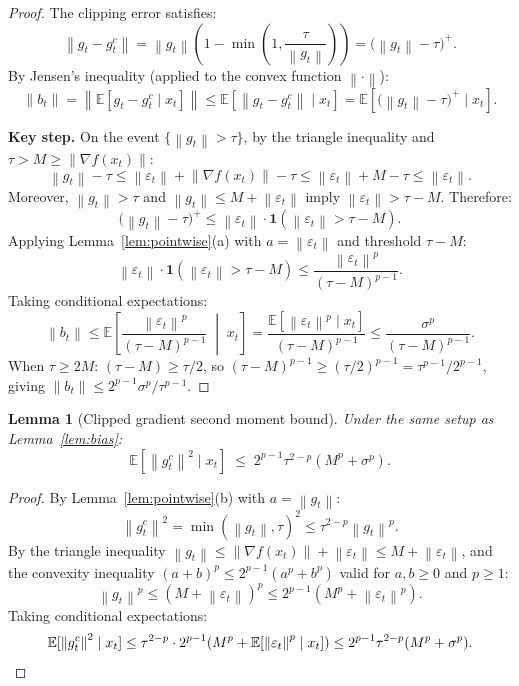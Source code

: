 \documentclass[11pt]{article}
\newtheorem{lemma}[theorem]{Lemma}
\theoremstyle{definition}
\newcommand{\E}{\mathbb{E}}
\newcommand{\norm}[1]{\left\| #1 \right\|}
\begin{document}
\begin{proof}
The clipping error satisfies:
\[
  \norm{g_t - g_t^c}
  = \norm{g_t}\!\left(1 - \min\!\left(1, \frac{\tau}{\norm{g_t}}\right)\right)
  = \bigl(\norm{g_t} - \tau\bigr)^+.
\]
By Jensen's inequality (applied to the convex function $\norm{\cdot}$):
\[
  \norm{b_t} = \norm{\E[g_t - g_t^c \mid x_t]}
  \leq \E\!\left[\norm{g_t - g_t^c} \mid x_t\right]
  = \E\!\left[\bigl(\norm{g_t} - \tau\bigr)^+ \mid x_t\right].
\]

\textbf{Key step.} On the event $\{\norm{g_t} > \tau\}$, by the triangle
inequality and $\tau > M \geq \norm{\nabla f(x_t)}$:
\[
  \norm{g_t} - \tau
  \leq \norm{\varepsilon_t} + \norm{\nabla f(x_t)} - \tau
  \leq \norm{\varepsilon_t} + M - \tau
  \leq \norm{\varepsilon_t}.
\]
Moreover, $\norm{g_t} > \tau$ and $\norm{g_t} \leq M + \norm{\varepsilon_t}$
imply $\norm{\varepsilon_t} > \tau - M$. Therefore:
\[
  \bigl(\norm{g_t} - \tau\bigr)^+
  \leq \norm{\varepsilon_t} \cdot \mathbf{1}\!\left(\norm{\varepsilon_t} > \tau - M\right).
\]
Applying Lemma~\ref{lem:pointwise}(a) with $a = \norm{\varepsilon_t}$ and
threshold $\tau - M$:
\[
  \norm{\varepsilon_t} \cdot \mathbf{1}(\norm{\varepsilon_t} > \tau - M)
  \leq \frac{\norm{\varepsilon_t}^p}{(\tau - M)^{p-1}}.
\]
Taking conditional expectations:
\[
  \norm{b_t}
  \leq \E\!\left[\frac{\norm{\varepsilon_t}^p}{(\tau - M)^{p-1}} \;\middle|\; x_t\right]
  = \frac{\E[\norm{\varepsilon_t}^p \mid x_t]}{(\tau - M)^{p-1}}
  \leq \frac{\sigma^p}{(\tau - M)^{p-1}}.
\]
When $\tau \geq 2M$: $(\tau - M) \geq \tau/2$, so $(\tau - M)^{p-1} \geq (\tau/2)^{p-1}
= \tau^{p-1}/2^{p-1}$, giving $\norm{b_t} \leq 2^{p-1}\sigma^p/\tau^{p-1}$.
\end{proof}

\begin{lemma}[Clipped gradient second moment bound]\label{lem:variance}
Under the same setup as Lemma~\ref{lem:bias}:
\[
  \E\!\left[\norm{g_t^c}^2 \mid x_t\right]
  \;\leq\; 2^{p-1}\tau^{2-p}\!\left(M^p + \sigma^p\right).
\]
\end{lemma}

\begin{proof}
By Lemma~\ref{lem:pointwise}(b) with $a = \norm{g_t}$:
\[
  \norm{g_t^c}^2 = \min(\norm{g_t}, \tau)^2 \leq \tau^{2-p}\norm{g_t}^p.
\]
By the triangle inequality $\norm{g_t} \leq \norm{\nabla f(x_t)} + \norm{\varepsilon_t}
\leq M + \norm{\varepsilon_t}$, and the convexity inequality $(a + b)^p \leq
2^{p-1}(a^p + b^p)$ valid for $a, b \geq 0$ and $p \geq 1$:
\[
  \norm{g_t}^p \leq (M + \norm{\varepsilon_t})^p \leq 2^{p-1}(M^p + \norm{\varepsilon_t}^p).
\]
Taking conditional expectations:
\[
  \E[\norm{g_t^c}^2 \mid x_t]
  \leq \tau^{2-p} \cdot 2^{p-1}\!\left(M^p + \E[\norm{\varepsilon_t}^p \mid x_t]\right)
  \leq 2^{p-1}\tau^{2-p}(M^p + \sigma^p).
  \qedhere
\]
\end{proof}
\end{document}
